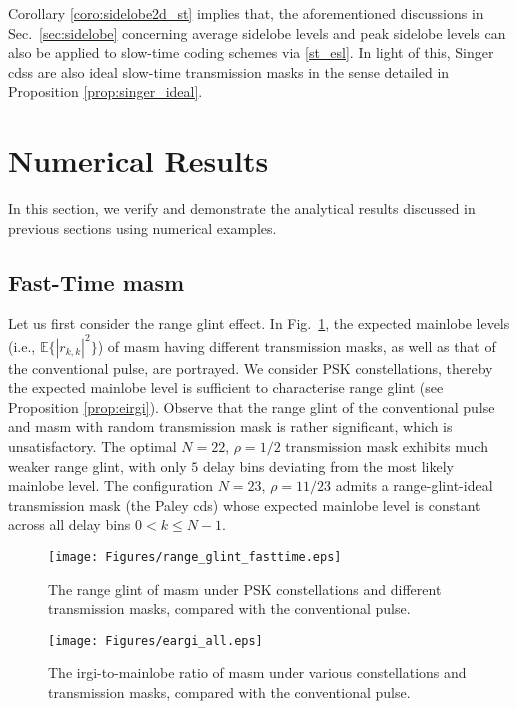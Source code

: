 \documentclass[journal,a4paper,10pt, romanappendices]{IEEEtran}
\begin{document}
Corollary \ref{coro:sidelobe2d_st} implies that, the aforementioned discussions in Sec.~\ref{sec:sidelobe} concerning average sidelobe levels and peak sidelobe levels can also be applied to slow-time coding schemes via \eqref{st_esl}. In light of this, Singer \acp{cds} are also ideal slow-time transmission masks in the sense detailed in Proposition \ref{prop:singer_ideal}.

\section{Numerical Results}\label{sec:numerical}
In this section, we verify and demonstrate the analytical results discussed in previous sections using numerical examples.
\subsection{Fast-Time \ac{masm}}
Let us first consider the range glint effect. In Fig.~\ref{fig:range_glint_fasttime}, the expected mainlobe levels (i.e., $\mathbb{E}\{|r_{k,k}|^2\}$) of \ac{masm} having different transmission masks, as well as that of the conventional pulse, are portrayed. We consider PSK constellations, thereby the expected mainlobe level is sufficient to characterise range glint (see Proposition \ref{prop:eirgi}). Observe that the range glint of the conventional pulse and \ac{masm} with random transmission mask is rather significant, which is unsatisfactory. The optimal $N=22$, $\rho=1/2$ transmission mask exhibits much weaker range glint, with only $5$ delay bins deviating from the most likely mainlobe level. The configuration $N=23$, $\rho=11/23$ admits a range-glint-ideal transmission mask (the Paley \ac{cds}) whose expected mainlobe level is constant across all delay bins $0<k\leq N-1$.

\begin{figure}[t]
    \centering
    \texttt{[image: Figures/range\_glint\_fasttime.eps]}
    \caption{The range glint of \ac{masm} under PSK constellations and different transmission masks, compared with the conventional pulse.}
    \label{fig:range_glint_fasttime}
    \vspace{-4mm}
\end{figure}

\begin{figure}[t]
    \centering
    \texttt{[image: Figures/eargi\_all.eps]}
    \caption{The \ac{irgi}-to-mainlobe ratio of \ac{masm} under various constellations and transmission masks, compared with the conventional pulse.}
    \label{fig:eargi_all}
    \vspace{-4mm}
\end{figure}
\end{document}
